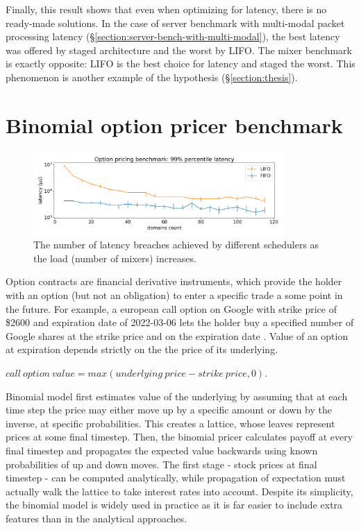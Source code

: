 \documentclass[12pt,a4paper,twoside]{report}
\begin{document}
Finally, this result shows that even when optimizing for latency, there is no ready-made solutions. In the case of server benchmark with multi-modal packet processing latency (\S\ref{section:server-bench-with-multi-modal}), the best latency was offered by staged architecture and the worst by LIFO. The mixer benchmark is exactly opposite: LIFO is the best choice for latency and staged the worst. This phenomenon is another example of the hypothesis (\S\ref{section:thesis}). 

\section{Binomial option pricer benchmark}
\label{section:binomial_option_pricer_result}

\begin{figure} 
    \centering 
    \includegraphics[width=0.85\textwidth]{eval/options-base.png}
    \caption{The number of latency breaches achieved by different schedulers as the load (number of mixers) increases.}
   \label{fig:options-bench}
\end{figure}

Option contracts are financial derivative instruments, which provide the holder with an option (but not an obligation) to enter a specific trade a some point in the future. For example, a european call option on Google with strike price of \$2600 and expiration date of 2022-03-06 lets the holder buy a specified number of Google shares at the strike price and on the expiration date \cite{Hull_John}. Value of an option at expiration depends strictly on the the price of its underlying.

\begin{center}
$call\:option\:value = max(underlying\:price - strike\:price, 0)$.
\end{center}

Binomial model first estimates value of the underlying by assuming that at each time step the price may either move up by a specific amount or down by the inverse, at specific probabilities. This creates a lattice, whose leaves represent prices at some final timestep. Then, the binomial pricer calculates payoff at every final timestep and propagates the expected value backwards using known probabilities of up and down moves. The first stage - stock prices at final timestep - can be computed analytically, while propagation of expectation must actually walk the lattice to take interest rates into account. Despite its simplicity, the binomial model is widely used in practice as it is far easier to include extra features than in the analytical approaches.
\end{document}
